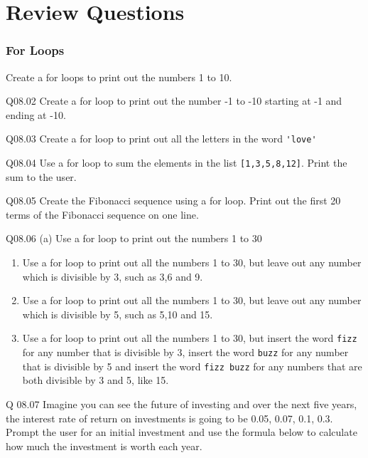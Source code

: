 \documentclass{book}
\newenvironment{problems}{}{}  %
\begin{document}
    




    
        \section{Review Questions}\label{review-questions}
    




    
        \subsubsection{For Loops}\label{for-loops}
    




    
        \begin{problems}
        08.01 Create a for loops to print out the numbers 1 to 10.

Q08.02 Create a for loop to print out the number -1 to -10 starting at
-1 and ending at -10.

Q08.03 Create a for loop to print out all the letters in the word
\lstinline!'love'!

Q08.04 Use a for loop to sum the elements in the list
\lstinline![1,3,5,8,12]!. Print the sum to the user.

Q08.05 Create the Fibonacci sequence using a for loop. Print out the
first 20 terms of the Fibonacci sequence on one line.

Q08.06 (a) Use a for loop to print out the numbers 1 to 30

\begin{enumerate}
\def\labelenumi{(\alph{enumi})}
\setcounter{enumi}{1}
\item
  Use a for loop to print out all the numbers 1 to 30, but leave out any
  number which is divisible by 3, such as 3,6 and 9.
\item
  Use a for loop to print out all the numbers 1 to 30, but leave out any
  number which is divisible by 5, such as 5,10 and 15.
\item
  Use a for loop to print out all the numbers 1 to 30, but insert the
  word \lstinline!fizz! for any number that is divisible by 3, insert
  the word \lstinline!buzz! for any number that is divisible by 5 and
  insert the word \lstinline!fizz buzz! for any numbers that are both
  divisible by 3 and 5, like 15.
\end{enumerate}

Q 08.07 Imagine you can see the future of investing and over the next
five years, the interest rate of return on investments is going to be
0.05, 0.07, 0.1, 0.3. Prompt the user for an initial investment and use
the formula below to calculate how much the investment is worth each
year.


\end{problems}
\end{document}
